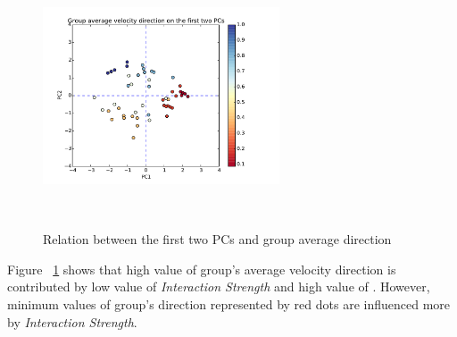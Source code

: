 \documentclass[a4paper,11pt,phdthesis,singlespace,twoside]{cssethesis}
\begin{document}
\begin{figure}[H]
\begin{center}
{\includegraphics[width=7cm,height=7cm]{figs/pca_lanscape_group_direction.pdf}}
\end{center}
\caption{Relation between the first two PCs and group average direction}
\label{fig:pca_lanscape_group_direction}
\end{figure}

Figure ~\ref{fig:pca_lanscape_group_direction} shows that high value of group's average velocity direction is contributed by low value of \textit{Interaction Strength} and high value of . However, minimum values of group's direction represented by red dots are influenced more by \textit{Interaction Strength}.  
\end{document}
